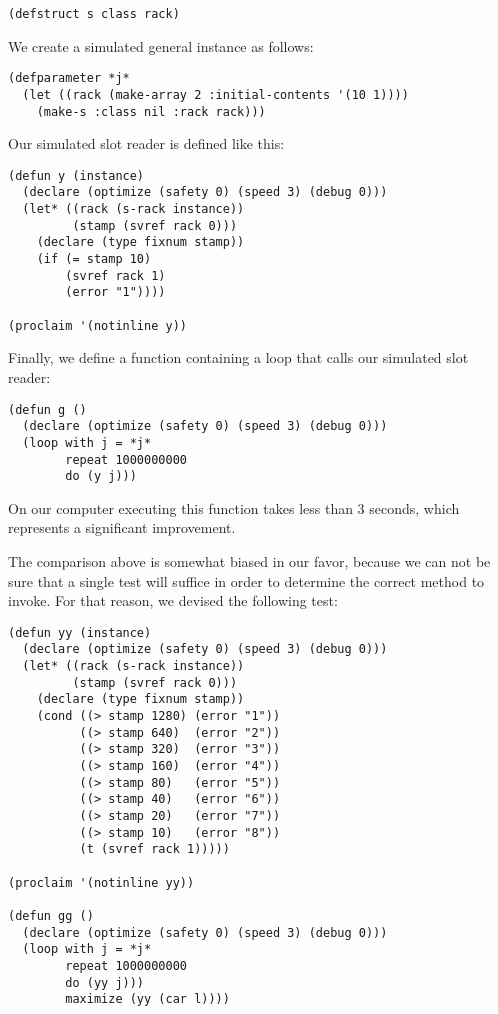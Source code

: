 \begin{verbatim}
(defstruct s class rack)
\end{verbatim}

We create a simulated general instance as follows:

\begin{verbatim}
(defparameter *j* 
  (let ((rack (make-array 2 :initial-contents '(10 1))))
    (make-s :class nil :rack rack)))
\end{verbatim}

Our simulated slot reader is defined like this:

\begin{verbatim}
(defun y (instance)
  (declare (optimize (safety 0) (speed 3) (debug 0)))
  (let* ((rack (s-rack instance))
         (stamp (svref rack 0)))
    (declare (type fixnum stamp))
    (if (= stamp 10)
        (svref rack 1)
        (error "1"))))

(proclaim '(notinline y))
\end{verbatim}

Finally, we define a function containing a loop that calls our
simulated slot reader:

\begin{verbatim}
(defun g ()
  (declare (optimize (safety 0) (speed 3) (debug 0)))
  (loop with j = *j*
        repeat 1000000000
        do (y j)))
\end{verbatim}

On our computer executing this function takes less than $3$ seconds,
which represents a significant improvement.

The comparison above is somewhat biased in our favor, because we can
not be sure that a single test will suffice in order to determine the
correct method to invoke.  For that reason, we devised the following
test: 

\begin{verbatim}
(defun yy (instance)
  (declare (optimize (safety 0) (speed 3) (debug 0)))
  (let* ((rack (s-rack instance))
         (stamp (svref rack 0)))
    (declare (type fixnum stamp))
    (cond ((> stamp 1280) (error "1"))
          ((> stamp 640)  (error "2"))
          ((> stamp 320)  (error "3"))
          ((> stamp 160)  (error "4"))
          ((> stamp 80)   (error "5"))
          ((> stamp 40)   (error "6"))
          ((> stamp 20)   (error "7"))
          ((> stamp 10)   (error "8"))
          (t (svref rack 1)))))

(proclaim '(notinline yy))

(defun gg ()
  (declare (optimize (safety 0) (speed 3) (debug 0)))
  (loop with j = *j*
        repeat 1000000000
        do (yy j)))
        maximize (yy (car l))))
\end{verbatim}

